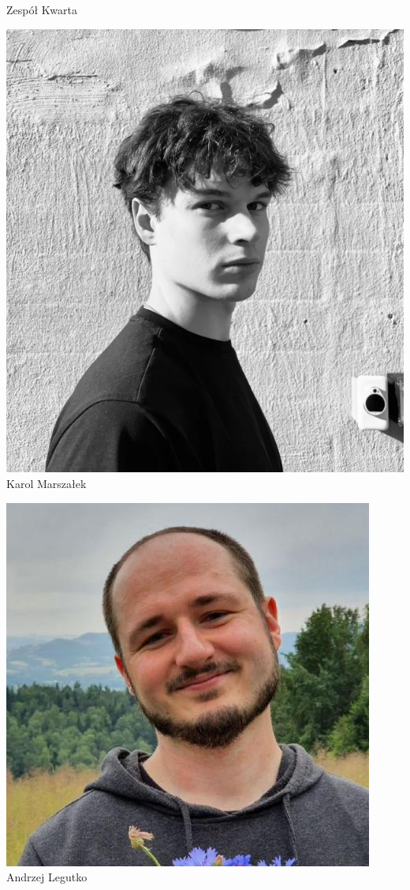 \begin{frame}[t]{Zespół Kwarta}
\begin{minipage}{0.22\linewidth}
\centering
\includegraphics[width=\linewidth]{img/KM}\\
\scriptsize Karol Marszałek \\
\scriptsize {}
\end{minipage}\pause
\hspace{2em}
\begin{minipage}{0.22\linewidth}
\centering
\includegraphics[width=\linewidth]{img/AL}\\
\scriptsize Andrzej Legutko \\
\scriptsize {}
\end{minipage}
\end{frame}
